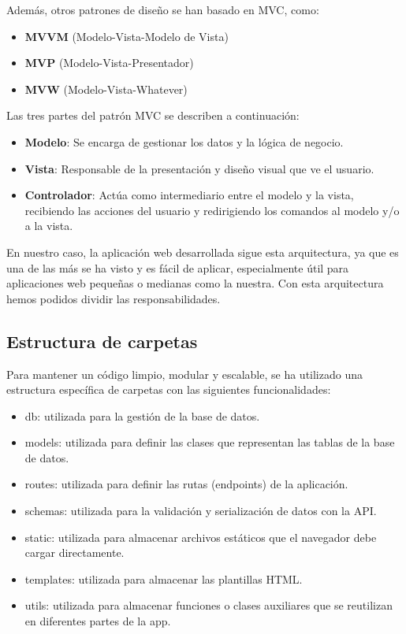 \documentclass[10pt]{book}
\begin{document}
Además, otros patrones de diseño se han basado en MVC, como:
\begin{itemize}
    \item \textbf{MVVM} (Modelo-Vista-Modelo de Vista)
    \item \textbf{MVP} (Modelo-Vista-Presentador)
    \item \textbf{MVW} (Modelo-Vista-Whatever)
\end{itemize}

Las tres partes del patrón MVC se describen a continuación:

\begin{itemize}
    \item \textbf{Modelo}: Se encarga de gestionar los datos y la lógica de negocio.
    \item \textbf{Vista}: Responsable de la presentación y diseño visual que ve el usuario.
    \item \textbf{Controlador}: Actúa como intermediario entre el modelo y la vista, recibiendo las acciones del usuario y redirigiendo los comandos al modelo y/o a la vista.
\end{itemize}

En nuestro caso, la aplicación web desarrollada sigue esta arquitectura, ya que es una de las más se ha visto y es fácil de aplicar, especialmente útil para aplicaciones web pequeñas o medianas como la nuestra. Con esta arquitectura hemos podidos dividir las responsabilidades.

\subsection{Estructura de carpetas}
        Para mantener un código limpio, modular y escalable, se ha utilizado una estructura específica de carpetas con las siguientes funcionalidades:
            \begin{itemize}
                \item db: utilizada para la gestión de la base de datos.
                \item models: utilizada para definir las clases que representan las tablas de la base de datos.
                \item routes: utilizada para definir las rutas (endpoints) de la aplicación.
                \item schemas: utilizada para la validación y serialización de datos con la API.
                \item static: utilizada para almacenar archivos estáticos que el navegador debe cargar directamente.
                \item templates: utilizada para almacenar las plantillas HTML.
                \item utils: utilizada para almacenar funciones o clases auxiliares que se reutilizan en diferentes partes de la app.
            \end{itemize}
\end{document}
